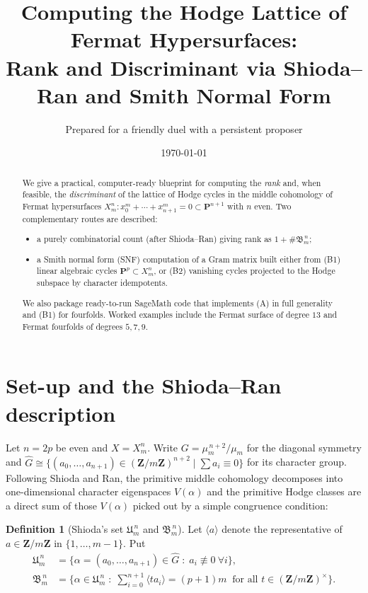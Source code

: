 \documentclass[11pt]{article}
\title{Computing the Hodge Lattice of Fermat Hypersurfaces:\\
Rank and Discriminant via Shioda--Ran and Smith Normal Form}
\author{Prepared for a friendly duel with a persistent proposer}
\date{\today}
\theoremstyle{definition}
\newtheorem{definition}{Definition}
\newcommand{\Xmn}{X_m^n}
\newcommand{\PP}{\mathbf{P}}
\newcommand{\ZZ}{\mathbf{Z}}
\begin{document}
\maketitle

\begin{abstract}
We give a practical, computer-ready blueprint for computing the \emph{rank} and, when feasible, the \emph{discriminant} of the lattice of Hodge cycles in the middle cohomology of Fermat hypersurfaces
\(\Xmn : x_0^m+\cdots+x_{n+1}^m=0\subset \PP^{n+1}\) with \(n\) even.
Two complementary routes are described:
\begin{itemize}[nosep]
\item[(A)] a purely combinatorial count (after Shioda--Ran) giving \(\mathrm{rank}\) as \(1+\#\mathfrak{B}_m^{\,n}\);
\item[(B)] a Smith normal form (SNF) computation of a Gram matrix built either from (B1) linear algebraic cycles \( \PP^p \subset \Xmn\), or (B2) vanishing cycles projected to the Hodge subspace by character idempotents.
\end{itemize}
We also package ready-to-run \textsf{SageMath} code that implements (A) in full generality and (B1) for fourfolds. Worked examples include the Fermat surface of degree \(13\) and Fermat fourfolds of degrees \(5,7,9\).
\end{abstract}

\section{Set-up and the Shioda--Ran description}
Let \(n=2p\) be even and \(X=\Xmn\). Write \(G=\mu_m^{\,n+2}/\mu_m\) for the diagonal symmetry and \(\widehat G\cong \{(a_0,\dots,a_{n+1})\in (\ZZ/m\ZZ)^{n+2}\mid \sum a_i\equiv 0\}\) for its character group.
Following Shioda and Ran, the primitive middle cohomology decomposes into one-dimensional character eigenspaces \(V(\alpha)\) and the primitive Hodge classes are a direct sum of those \(V(\alpha)\) picked out by a simple congruence condition:

\begin{definition}[Shioda's set \(\mathfrak U_m^{\,n}\) and \(\mathfrak B_m^{\,n}\)]
Let \(\langle a\rangle\) denote the representative of \(a\in\ZZ/m\ZZ\) in \(\{1,\dots,m-1\}\). Put
\begin{align*}
\mathfrak U_m^{\,n}&=\Big\{\alpha=(a_0,\dots,a_{n+1})\in\widehat G\;:\; a_i\not\equiv 0\ \forall i\Big\},\\
\mathfrak B_m^{\,n}&=\Big\{\alpha\in\mathfrak U_m^{\,n}\;:\; \sum_{i=0}^{n+1}\big\langle t a_i\big\rangle =(p+1)m\ \text{ for all }t\in (\ZZ/m\ZZ)^\times\Big\}.
\end{align*}
\end{definition}
\end{document}
